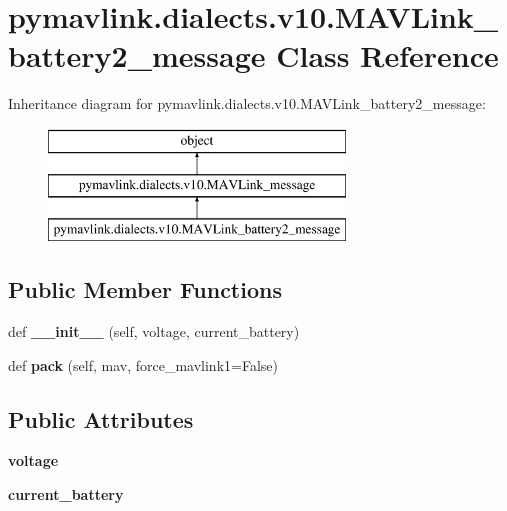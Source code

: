 \hypertarget{classpymavlink_1_1dialects_1_1v10_1_1MAVLink__battery2__message}{}\section{pymavlink.\+dialects.\+v10.\+M\+A\+V\+Link\+\_\+battery2\+\_\+message Class Reference}
\label{classpymavlink_1_1dialects_1_1v10_1_1MAVLink__battery2__message}
Inheritance diagram for pymavlink.\+dialects.\+v10.\+M\+A\+V\+Link\+\_\+battery2\+\_\+message\+:\begin{figure}[H]
\begin{center}
\leavevmode
\includegraphics[height=3.000000cm]{classpymavlink_1_1dialects_1_1v10_1_1MAVLink__battery2__message}
\end{center}
\end{figure}
\subsection*{Public Member Functions}
\begin{DoxyCompactItemize}
\item 
\mbox{\label{classpymavlink_1_1dialects_1_1v10_1_1MAVLink__battery2__message_a208d5b64b335cbc5c733dbf547d3e988}} 
def {\bfseries \+\_\+\+\_\+init\+\_\+\+\_\+} (self, voltage, current\+\_\+battery)
\item 
\mbox{\label{classpymavlink_1_1dialects_1_1v10_1_1MAVLink__battery2__message_a4dd2bc470652b8e26258f7619965146c}} 
def {\bfseries pack} (self, mav, force\+\_\+mavlink1=False)
\end{DoxyCompactItemize}
\subsection*{Public Attributes}
\begin{DoxyCompactItemize}
\item 
\mbox{\label{classpymavlink_1_1dialects_1_1v10_1_1MAVLink__battery2__message_a57f1b7277767387bd57c2a6516348322}} 
{\bfseries voltage}
\item 
\mbox{\label{classpymavlink_1_1dialects_1_1v10_1_1MAVLink__battery2__message_a118aca3099407b2ba18dfb9602443206}} 
{\bfseries current\+\_\+battery}
\end{DoxyCompactItemize}
